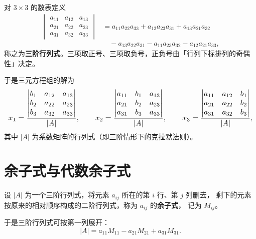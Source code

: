 \begin{definition}[三阶行列式的组合定义]
对 $3\times 3$ 的数表定义
\begin{align*}
\begin{vmatrix}
a_{11} & a_{12} & a_{13}\\
a_{21} & a_{22} & a_{23}\\
a_{31} & a_{32} & a_{33}
\end{vmatrix}
& = a_{11}a_{22}a_{33}+a_{12}a_{23}a_{31}+a_{13}a_{21}a_{32}\\
&\quad -a_{13}a_{22}a_{31}-a_{11}a_{23}a_{32}-a_{12}a_{21}a_{33},
\end{align*}
称之为\textbf{三阶行列式}。三项取正号、三项取负号，正负号由「行列下标排列的奇偶性」决定。
\end{definition}

于是三元方程组的解为
\[
\resizebox{\linewidth}{!}{$\displaystyle
x_1=\frac{\begin{vmatrix}
b_1 & a_{12} & a_{13}\\
b_2 & a_{22} & a_{23}\\
b_3 & a_{32} & a_{33}
\end{vmatrix}}{|A|},\qquad
x_2=\frac{\begin{vmatrix}
a_{11} & b_1 & a_{13}\\
a_{21} & b_2 & a_{23}\\
a_{31} & b_3 & a_{33}
\end{vmatrix}}{|A|},\qquad
x_3=\frac{\begin{vmatrix}
a_{11} & a_{12} & b_1\\
a_{21} & a_{22} & b_2\\
a_{31} & a_{32} & b_3
\end{vmatrix}}{|A|}$},
\]
其中 $|A|$ 为系数矩阵的行列式（即三阶情形下的克拉默法则）。

\section{余子式与代数余子式}

\begin{definition}[余子式]
设 $|A|$ 为一个三阶行列式，将元素 $a_{ij}$ 所在的第 $i$ 行、第 $j$ 列删去，
剩下的元素按原来的相对顺序构成的二阶行列式，称为 $a_{ij}$ 的\textbf{余子式}，
记为 $M_{ij}$。
\end{definition}

于是三阶行列式可按第一列展开：
\begin{equation}
|A| = a_{11}M_{11}-a_{21}M_{21}+a_{31}M_{31}.
\end{equation}


